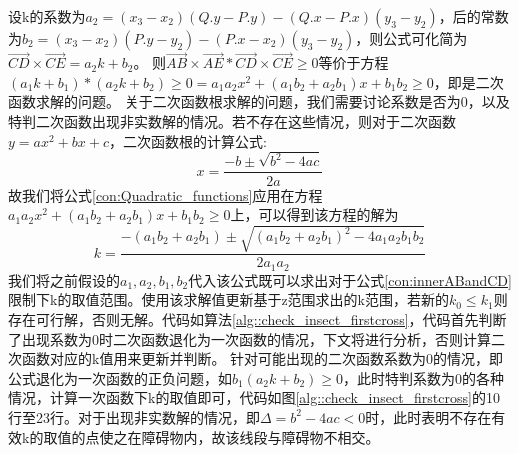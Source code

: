 设k的系数为$a_2=(x_3-x_2)(Q.y-P.y)-(Q.x-P.x)(y_3-y_2)$，后的常数为$b_2=(x_3-x_2)(P.y-y_2)-(P.x-x_2)(y_3-y_2)$，则公式可化简为$\vec{CD}\times\vec{CE} = a_2k+b_2$。
则$\vec{AB}\times\vec{AE}*\vec{CD}\times\vec{CE}\ge 0$等价于方程$(a_1k+b_1)*(a_2k+b_2) \ge 0 = a_1a_2x^2+(a_1b_2+a_2b_1)x+b_1b_2 \ge 0$，即是二次函数求解的问题。
关于二次函数根求解的问题，我们需要讨论系数是否为0，以及特判二次函数出现非实数解的情况。若不存在这些情况，则对于二次函数$y=ax^2+bx+c$，二次函数根的计算公式:
\begin{equation}
    x=\dfrac{-b\pm\sqrt{b^2-4ac}}{2a}
\label{con:Quadratic_functions}
\end{equation}
故我们将公式\ref{con:Quadratic_functions}应用在方程$a_1a_2x^2+(a_1b_2+a_2b_1)x+b_1b_2 \ge 0$上，可以得到该方程的解为
\begin{equation}
    k=\dfrac{-(a_1b_2+a_2b_1)\pm\sqrt{(a_1b_2+a_2b_1)^2-4a_1a_2b_1b_2}}{2a_1a_2}
\label{con:kBaseOnQuadFun}
\end{equation}
我们将之前假设的$a_1,a_2,b_1,b_2$代入该公式既可以求出对于公式\ref{con:innerABandCD}限制下k的取值范围。使用该求解值更新基于z范围求出的k范围，若新的$k_0\leq k_1$则存在可行解，否则无解。代码如算法\ref{alg::check_insect_firstcross}，代码首先判断了出现系数为0时二次函数退化为一次函数的情况，下文将进行分析，否则计算二次函数对应的k值用来更新并判断。
针对可能出现的二次函数系数为0的情况，即公式退化为一次函数的正负问题，如$b_1(a_2k+b_2)\ge 0$，此时特判系数为0的各种情况，计算一次函数下k的取值即可，代码如图\ref{alg::check_insect_firstcross}的10行至23行。对于出现非实数解的情况，即$\Delta=b^2-4ac<0$时，此时表明不存在有效k的取值的点使之在障碍物内，故该线段与障碍物不相交。
